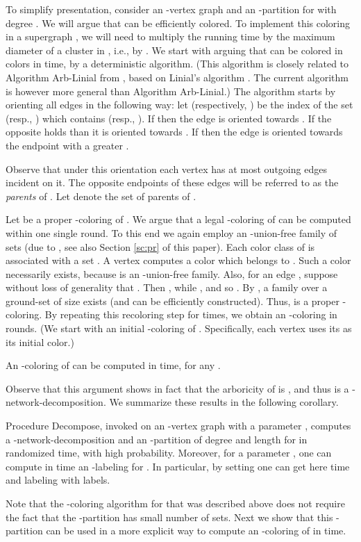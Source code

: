 \documentclass[11pt]{article}
\begin{document}
To simplify presentation, consider an -vertex graph  and an -partition  for  with degree . We will argue that  can be efficiently colored. To implement this coloring in a supergraph , we will need to multiply the running time by the maximum diameter of a cluster in , i.e., by . We start with arguing that  can be colored in  colors in  time, by a deterministic algorithm. (This algorithm is closely related to Algorithm Arb-Linial from \cite{BE08}, based on Linial's algorithm \cite{L92}. The current algorithm is however more general than Algorithm Arb-Linial.) The algorithm starts by orienting all edges  in the following way: let  (respectively, ) be the index of the set  (resp., ) which contains  (resp., ). If  then the edge is oriented towards . If the opposite holds than it is oriented towards . If  then the edge is oriented towards the endpoint with a greater .

Observe that under this orientation each vertex  has at most  outgoing edges incident on it. The opposite endpoints of these edges will be referred to as the {\em parents} of . Let  denote the set of parents of .

Let  be a proper -coloring of . We argue that a legal -coloring  of  can be computed within one single round. To this end we again employ an -union-free family  of  sets (due to \cite{EFF85}, see also Section \ref{sc:pr} of this paper). Each color class  of  is associated with a set . A vertex  computes a color  which belongs to . Such a color necessarily exists, because  is an -union-free family. Also, for an edge , suppose without loss of generality that . Then , while , and so . By \cite{EFF85}, a family  over a ground-set of size  exists (and can be efficiently constructed). Thus,  is a proper -coloring. By repeating this recoloring step for  times, we obtain an -coloring in  rounds. (We start with an initial -coloring of . Specifically, each vertex uses its  as its initial color.)

\begin{col}
An -coloring of  can be computed in  time, for any .
\end{col}
Observe that this argument shows in fact that the arboricity of  is , and thus  is a -network-decomposition. We summarize these results in the following corollary.
\begin{col} \label{partdec}
Procedure Decompose, invoked on an -vertex graph  with a parameter , computes a -network-decomposition  and an -partition  of degree  and length  for  in  randomized time, with high probability. Moreover, for a parameter , one can compute in  time an -labeling for . In particular, by setting  one can get here time  and labeling with  labels.
\end{col}
Note that the -coloring algorithm for  that was described above does not require the fact that the -partition  has small number of sets. Next we show that this -partition can be used in a more explicit way to compute an -coloring of  in  time.
\end{document}
